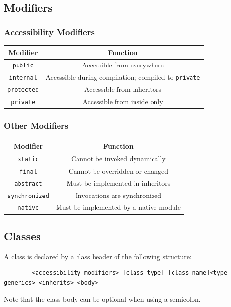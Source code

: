 \documentclass{docs}
\begin{document}
    \subsection{Modifiers}
    
    \subsubsection{Accessibility Modifiers}
    \begin{center}
    \begin{tabular}{c|c}
        Modifier & Function \\
        \hline
        \texttt{public} & Accessible from everywhere \\
        \texttt{internal} & Accessible during compilation; compiled to \texttt{private} \\
        \texttt{protected} & Accessible from inheritors \\
        \texttt{private} & Accessible from inside only
    \end{tabular}
    \end{center}
    
    \subsubsection{Other Modifiers}
    \begin{center}
    \begin{tabular}{c|c}
        Modifier & Function \\
        \hline
        \texttt{static} & Cannot be invoked dynamically \\
        \texttt{final} & Cannot be overridden or changed \\
        \texttt{abstract} & Must be implemented in inheritors \\
        \texttt{synchronized} & Invocations are synchronized \\
        \texttt{native} & Must be implemented by a native module
    \end{tabular}
    \end{center}
    
    \subsection{Classes}
    A class is declared by a class header of the following structure:
    \begin{verbatim}
        <accessibility modifiers> [class type] [class name]<type generics> <inherits> <body>
    \end{verbatim}
    Note that the class body can be optional when using a semicolon.
    
\end{document}
